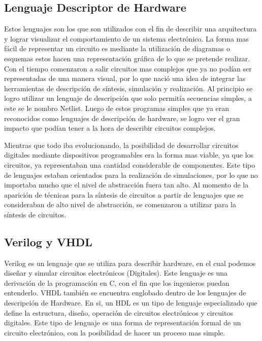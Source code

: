 \subsection*{Lenguaje Descriptor de Hardware}

Estos lenguajes son los que son utilizados con el fin de describir una arquitectura y lograr visualizar el comportamiento de un sistema electrónico. 
La forma mas fácil de representar un circuito es mediante la utilización de diagramas o esquemas estos hacen una representación gráfica de lo que se pretende realizar. 
Con el tiempo comenzaron a salir circuitos mas complejos que ya no podían ser representadas de una manera visual, por lo que nació una idea de integrar las herramientas de descripción de síntesis, simulación y realización. Al principio se logro utilizar un lenguaje de descripción que solo permitía secuencias simples, a este se le nombro Netlist. Luego de estos programas simples que ya eran reconocidos como lenguajes de descripción de hardware, se logro ver el gran impacto que podían tener a la hora de describir circuitos complejos.

Mientras que todo iba evolucionando, la posibilidad de desarrollar circuitos digitales mediante dispositivos programables era la forma mas viable, ya que los circuitos, ya representaban una cantidad considerable de componentes. Este tipo de lenguajes estaban orientados para la realización de simulaciones, por lo que no importaba mucho que el nivel de abstracción fuera tan alto. Al momento de la aparición de técnicas para la síntesis de circuitos a partir de lenguajes que se consideraban de alto nivel de abstracción, se comenzaron a utilizar para la síntesis de circuitos. 
\cite{DDH} 

\subsection*{Verilog y VHDL}

Verilog es un lenguaje que se utiliza para describir hardware, en el cual podemos diseñar y simular circuitos electrónicos (Digitales). Este lenguaje es una derivación de la programación en C, con el fin que los ingenieros puedan entenderlo. 
 VHDL también se encuentra englobado dentro de los lenguajes de descripción de Hardware. En si, un HDL es un tipo de lenguaje especializado que define la estructura, diseño, operación de circuitos electrónicos y circuitos digitales.
 Este tipo de lenguaje es una forma de representación formal de un circuito electrónico, con la posibilidad de hacer un proceso mas simple.
 
